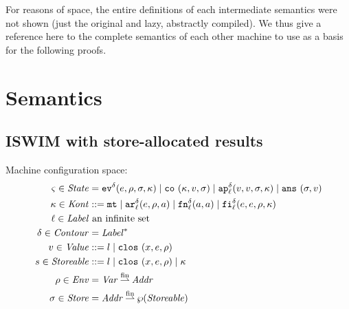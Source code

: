 \documentclass{llncs}
\newcommand{\finto}{\mathbin{\overset{\text{fin}}{\rightharpoonup}}}
\newcommand{\Var}{\mathit{Var}}
\newcommand{\alt}{\mid}
\begin{document}
For reasons of space, the entire definitions of each intermediate
semantics were not shown (just the original and lazy, abstractly
compiled). We thus give a reference here to the complete semantics of
each other machine to use as a basis for the following proofs.

\section{Semantics}

\subsection{ISWIM with store-allocated results}

Machine configuration space:
\begin{align*}
\mstate \in \State &= \ev[^\mcntr]{\mexp, \menv, \msto, \mkont} \alt
                     \co{\mkont, \mval, \msto} \alt
                     \ap[_\mlab^\mcntr]{\mval,\mval,\msto,\mkont} \alt
                     \ans{\msto,\mval} \\
\mkont \in \Kont &::= \kmt \alt
                      \kar[_\mlab^\mcntr]{\mexp, \menv, \maddr} \alt
                      \kfn[_\mlab^\mcntr]{\maddr, \maddr} \alt
                      \kif[_\mlab^\mcntr]{\mexp, \mexp, \menv, \mkont} \\
\mlab \in \Label &\text{ an infinite set} \\
\mcntr \in \Counter &= \Label^* \\
\mval \in \Value &::= \mlit \alt
                      \clos{\mvar,\mexp,\menv} \\
\mstor \in \Storeable &::= \mlit \alt
                           \clos{\mvar,\mexp,\menv} \alt
                           \mkont \\
\menv \in \Env &= \Var \finto \Addr \\
\msto \in \Store &= \Addr \finto \wp(\Storeable)
\end{align*}
\end{document}

